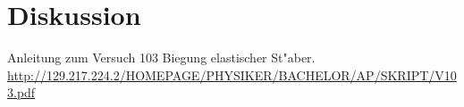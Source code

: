\section{Diskussion}
	\label{sec:diskussion}


\begin{thebibliography}{9}

	 Anleitung zum Versuch 103 Biegung elastischer St"aber. \url{http://129.217.224.2/HOMEPAGE/PHYSIKER/BACHELOR/AP/SKRIPT/V103.pdf}

\end{thebibliography}